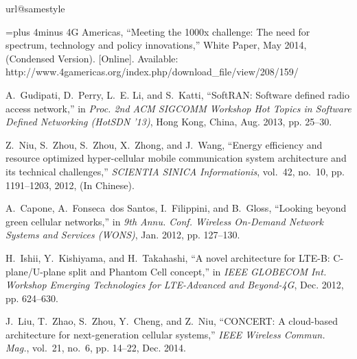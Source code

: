 \documentclass[conference]{IEEEtran}
\begin{document}
\begin{thebibliography}{10}
\providecommand{\url}[1]{#1}
\csname url@samestyle\endcsname
\providecommand{\newblock}{\relax}
\providecommand{\bibinfo}[2]{#2}
\providecommand{\BIBentrySTDinterwordspacing}{\spaceskip=0pt\relax}
\providecommand{\BIBentryALTinterwordstretchfactor}{4}
\providecommand{\BIBentryALTinterwordspacing}{\spaceskip=\fontdimen2\font plus
\BIBentryALTinterwordstretchfactor\fontdimen3\font minus
  \fontdimen4\font\relax}
\providecommand{\BIBforeignlanguage}[2]{{\expandafter\ifx\csname l@#1\endcsname\relax
\typeout{** WARNING: IEEEtran.bst: No hyphenation pattern has been}\typeout{** loaded for the language `#1'. Using the pattern for}\typeout{** the default language instead.}\else
\language=\csname l@#1\endcsname
\fi
#2}}
\providecommand{\BIBdecl}{\relax}
\BIBdecl

\BIBentryALTinterwordspacing
{4G Americas}, ``Meeting the 1000x challenge: The need for spectrum, technology
  and policy innovations,'' White Paper, May 2014, (Condensed Version).
  [Online]. Available:
  \url{http://www.4gamericas.org/index.php/download_file/view/208/159/}
\BIBentrySTDinterwordspacing

A.~Gudipati, D.~Perry, L.~E. Li, and S.~Katti, ``{S}oft{RAN}: Software defined
  radio access network,'' in \emph{Proc. 2nd ACM SIGCOMM Workshop Hot Topics in
  Software Defined Networking (HotSDN '13)}, Hong Kong, China, Aug. 2013, pp.
  25--30.

Z.~Niu, S.~Zhou, S.~Zhou, X.~Zhong, and J.~Wang, ``Energy efficiency and
  resource optimized hyper-cellular mobile communication system architecture
  and its technical challenges,'' \emph{SCIENTIA SINICA Informationis},
  vol.~42, no.~10, pp. 1191--1203, 2012, (In Chinese).

A.~Capone, A.~Fonseca~dos Santos, I.~Filippini, and B.~Gloss, ``Looking beyond
  green cellular networks,'' in \emph{9th Annu. Conf. Wireless On-Demand
  Network Systems and Services (WONS)}, Jan. 2012, pp. 127--130.

H.~Ishii, Y.~Kishiyama, and H.~Takahashi, ``A novel architecture for {LTE-B}:
  {C}-plane/{U}-plane split and {P}hantom {C}ell concept,'' in \emph{IEEE
  GLOBECOM Int. Workshop Emerging Technologies for LTE-Advanced and Beyond-4G},
  Dec. 2012, pp. 624--630.

J.~Liu, T.~Zhao, S.~Zhou, Y.~Cheng, and Z.~Niu, ``{CONCERT}: A cloud-based
  architecture for next-generation cellular systems,'' \emph{{IEEE} Wireless
  Commun. Mag.}, vol.~21, no.~6, pp. 14--22, Dec. 2014.


\end{thebibliography}
\end{document}

